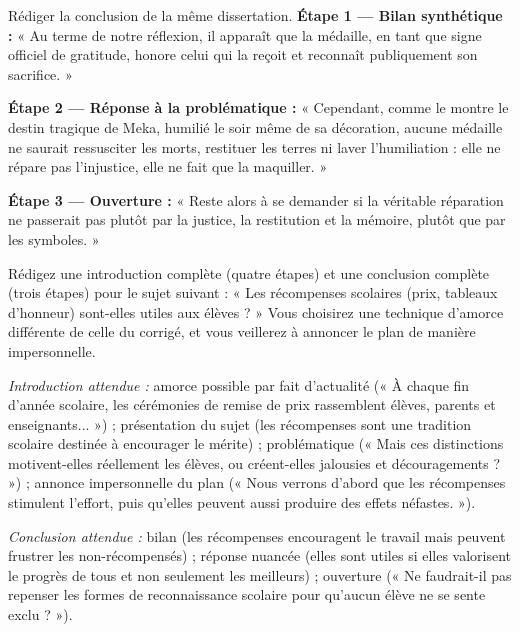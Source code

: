 \documentclass[11pt]{article}
\begin{document}
\begin{exoresolu}
Rédiger la conclusion de la même dissertation.
\tcblower
\textbf{Étape 1 — Bilan synthétique :} « Au terme de notre réflexion, il apparaît que la médaille, en tant que signe officiel de gratitude, honore celui qui la reçoit et reconnaît publiquement son sacrifice. »

\textbf{Étape 2 — Réponse à la problématique :} « Cependant, comme le montre le destin tragique de Meka, humilié le soir même de sa décoration, aucune médaille ne saurait ressusciter les morts, restituer les terres ni laver l'humiliation : elle ne répare pas l'injustice, elle ne fait que la maquiller. »

\textbf{Étape 3 — Ouverture :} « Reste alors à se demander si la véritable réparation ne passerait pas plutôt par la justice, la restitution et la mémoire, plutôt que par les symboles. »
\end{exoresolu}

\begin{exercice}
Rédigez une introduction complète (quatre étapes) et une conclusion complète (trois étapes) pour le sujet suivant : « Les récompenses scolaires (prix, tableaux d'honneur) sont-elles utiles aux élèves ? » Vous choisirez une technique d'amorce différente de celle du corrigé, et vous veillerez à annoncer le plan de manière impersonnelle.
\end{exercice}

\begin{corrige}
\emph{Introduction attendue :} amorce possible par fait d'actualité (« À chaque fin d'année scolaire, les cérémonies de remise de prix rassemblent élèves, parents et enseignants... ») ; présentation du sujet (les récompenses sont une tradition scolaire destinée à encourager le mérite) ; problématique (« Mais ces distinctions motivent-elles réellement les élèves, ou créent-elles jalousies et découragements ? ») ; annonce impersonnelle du plan (« Nous verrons d'abord que les récompenses stimulent l'effort, puis qu'elles peuvent aussi produire des effets néfastes. »).

\emph{Conclusion attendue :} bilan (les récompenses encouragent le travail mais peuvent frustrer les non-récompensés) ; réponse nuancée (elles sont utiles si elles valorisent le progrès de tous et non seulement les meilleurs) ; ouverture (« Ne faudrait-il pas repenser les formes de reconnaissance scolaire pour qu'aucun élève ne se sente exclu ? »).
\end{corrige}
\end{document}
